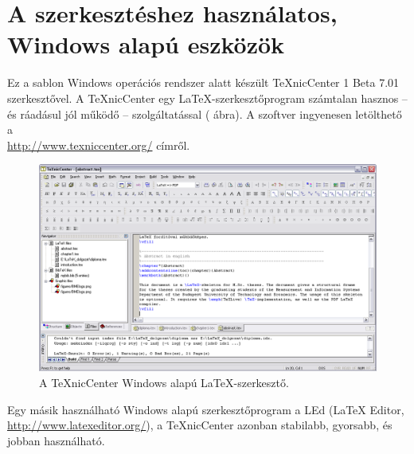 \section{A szerkesztéshez használatos, Windows alapú eszközök}
Ez a sablon Windows operációs rendszer alatt készült TeXnicCenter 1 Beta 7.01 szerkesztővel. A TeXnicCenter egy \LaTeX-szerkesztőprogram számtalan hasznos -- és ráadásul jól működő -- szolgáltatással ( ábra). A szoftver ingyenesen letölthető a\\\url{http://www.texniccenter.org/} címről.

\begin{figure}[!ht]
\centering
\includegraphics[width=150mm, keepaspectratio]{figures/TeXnicCenter.png}
\caption{A TeXnicCenter Windows alapú \LaTeX-szerkesztő.} 
\label{fig:TexnicCenter}
\end{figure}

Egy másik használható Windows alapú szerkesztőprogram a LEd (LaTeX Editor,\\\url{http://www.latexeditor.org/}), a TeXnicCenter azonban stabilabb, gyorsabb, és jobban használható.
